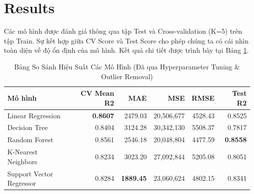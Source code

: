 \section{Results}

Các mô hình được đánh giá thông qua tập Test và Cross-validation (K=5) trên tập Train. Sự kết hợp giữa CV Score và Test Score cho phép chúng ta có cái nhìn toàn diện về độ ổn định của mô hình. Kết quả chi tiết được trình bày tại Bảng \ref{tab:results}.

\begin{table}[H]
  \caption{Bảng So Sánh Hiệu Suất Các Mô Hình (Đã qua Hyperparameter Tuning \& Outlier Removal)}
  \label{tab:results}
  \centering
  \begin{tabular}{lrrrrr}
    \toprule
    Mô hình & CV Mean R2 & MAE & MSE & RMSE & Test R2 \\
    \midrule
    Linear Regression & \textbf{0.8607} & 2479.03 & 20,506,677 & 4528.43 & 0.8525 \\
    Decision Tree & 0.8404 & 3124.28 & 30,342,130 & 5508.37 & 0.7817 \\
    Random Forest & 0.8561 & 2546.18 & 20,048,804 & 4477.59 & \textbf{0.8558} \\
    K-Nearest Neighbors & 0.8234 & 3023.20 & 27,092,844 & 5205.08 & 0.8051 \\
    Support Vector Regressor & 0.8284 & \textbf{1889.45} & 23,060,624 & 4802.15 & 0.8341 \\
    \bottomrule
  \end{tabular}
\end{table}
